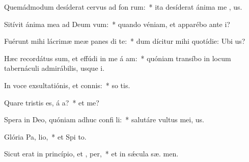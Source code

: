 \item Quemádmodum desíderat cervus ad fon rum:~* ita desíderat ánima me  , us.
\item Sitívit ánima mea ad Deum  vum:~* quando véniam, et apparébo ante  i?
\item Fuérunt mihi lácrimæ meæ panes di  te:~* dum dícitur mihi quotídie: Ubi   us?
\item Hæc recordátus sum, et effúdi in me á am:~* quóniam transíbo in locum tabernáculi admirábilis, usque   i.
\item In voce exsultatiónis, et connis:~* so tis.
\item Quare tristis es, á a?~* et   me?
\item Spera in Deo, quóniam adhuc confi li:~* salutáre vultus mei,   us.
\item Glória Pa,  lio,~* et Spi to.
\item Sicut erat in princípio, et ,  per,~* et in sǽcula sæ. men.
